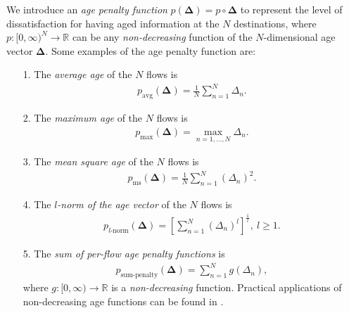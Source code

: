We introduce an \emph{age penalty function} $p(\bm{\Delta}) = p\circ \bm{\Delta}$  to represent the level of dissatisfaction for having aged information at the $N$ destinations, where $p: [0,\infty)^N\rightarrow \mathbb{R}$ can be any  \emph{non-decreasing} function of the $N$-dimensional age vector  $\bm{\Delta}$. Some  examples of the age penalty function are: %
\begin{itemize}
\item[1.] The \emph{average age} of the $N$ flows is
\begin{align}\label{eq_avgage}
p_{\text{avg}} (\bm{\Delta}) = \frac{1}{N}\sum_{n=1}^N \Delta_{n}. 
\end{align}

\item[2.] The \emph{maximum age} of the $N$ flows is
\begin{align}%
p_{\max} (\bm{\Delta}) = \max_{n=1,\ldots,N} \Delta_{n}.
\end{align}

\item[3.] The \emph{mean square age} of the $N$ flows is
\begin{align}%
p_{\text{ms}} (\bm{\Delta}) = \frac{1}{N}\sum_{n=1}^N (\Delta_{n} )^2.
\end{align}

\item[4.] The \emph{$l$-norm of the age vector} of the $N$ flows is
\begin{align}%
p_{\text{$l$-norm}} (\bm{\Delta}) = \left[\sum_{n=1}^N (\Delta_{n} )^l\right]^{\frac{1}{l}}, ~l\geq1.
\end{align}









\item[5.] The \emph{sum of per-flow age penalty functions} is
\begin{align}%
p_{\text{sum-penalty}} (\bm{\Delta}) = \sum_{n=1}^N g(\Delta_{n}),
\end{align}
where $g: [0,\infty) \rightarrow \mathbb{R}$ is a \emph{non-decreasing} function. Practical applications of non-decreasing age functions can be found in \cite{SunNonlinear2019,yates2021AgeSurvey,shisher2021age,ShisherMobiHoc22,shisher2023learning}. 


\end{itemize}
